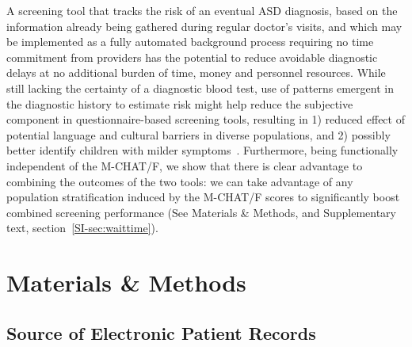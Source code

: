 \documentclass[onecolumn,10pt]{IEEEtran}
\begin{document}
A  screening  tool that tracks the risk of an eventual ASD diagnosis,  based  on the information already being gathered during regular doctor's visits, and which may be implemented as a  fully automated background process requiring no time commitment from providers has the potential to reduce avoidable diagnostic  delays at no additional burden of time, money and personnel resources.  While still lacking the certainty of a diagnostic blood test,  use of patterns emergent in  the diagnostic history to estimate risk might help reduce the subjective component in questionnaire-based screening tools, resulting in 1) reduced effect of potential language and cultural barriers in diverse populations, and 2) possibly better identify children with milder symptoms~\cite{hyman2020identification}.
Furthermore, being functionally independent of the M-CHAT/F, we show that there is clear advantage to combining the outcomes of the two tools: we can take advantage of any population stratification induced by the M-CHAT/F scores to significantly boost combined screening performance (See Materials \&  Methods, and Supplementary text, section~\ref{SI-sec:waittime}).
 



\section*{Materials \& Methods}
\subsection*{Source of Electronic Patient Records}
\end{document}
